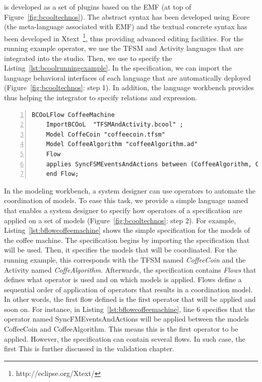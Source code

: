 \bcool is developed as a set of plugins based on the EMF (at top of Figure~\ref{fig:bcooltechnos}). The \bcool abstract syntax has been developed using Ecore (\ie the meta-language associated with EMF) and the textual concrete syntax has been developed in Xtext~\footnote{http://eclipse.org/Xtext/}, thus providing advanced editing facilities. For the running example operator, we use the TFSM and Activity languages that are integrated into the studio. Then, we use \bcool to specify the Listing~\ref{lst:bcoolrunningexample}. In the \bcool specification, we can import the language behavioral interfaces of each language that are automatically deployed (Figure~\ref{fig:bcooltechnos}: step 1). In addition, the language workbench provides \moccml thus helping the integrator to specify relations and expression.      

	\begin{lstlisting}[language=bflow,
	caption={\bflow specification for the models of the coffee machine},
	label={lst:bflowcoffeemachine}, 
	basicstyle=\scriptsize\ttfamily, backgroundcolor=\color{LGrey}, numbers=left, xleftmargin=2pt]
	BCOoLFlow CoffeeMachine
	ImportBCOoL  "TFSMAndActivity.bcool" ;
	Model CoffeCoin "coffeecoin.tfsm"
	Model CoffeeAlgorithm "coffeeAlgorithm.ad"
	Flow 
	applies SyncFSMEventsAndActions between (CoffeeAlgorithm, CoffeCoin);
	end Flow;
	\end{lstlisting}


In the modeling workbench, a system designer can use \bcool operators to automate the coordination of models. To ease this task, we provide a simple language named \bflow that enables a system designer to specify how operators of a \bcool specification are applied on a set of models (Figure~\ref{fig:bcooltechnos}: step 2). For example, Listing~\ref{lst:bflowcoffeemachine} shows the simple \bflow specification for the models of the coffee machine. The \bflow specification begins by importing the \bcool specification that will be used. Then, it specifies the models that will be coordinated. For the running example, this corresponds with the TFSM named \emph{CoffeeCoin} and the Activity named \emph{CoffeAlgorithm}. Afterwards, the specification contains \emph{Flows} that defines what operator is used and on which models is applied. Flows define a sequential order of application of operators that results in a \ccsl coordination model. In other words, the first flow defined is the first operator that will be applied and soon on. For instance, in Listing~\ref{lst:bflowcoffeemachine}, line 6 specifies that the operator named SyncFMEventsAndActions will be applied between the models CoffeeCoin and CoffeeAlgorithm. This means this is the first operator to be applied. However, the specification can contain several flows. In such case, the first  This is further discussed in the validation chapter.  


